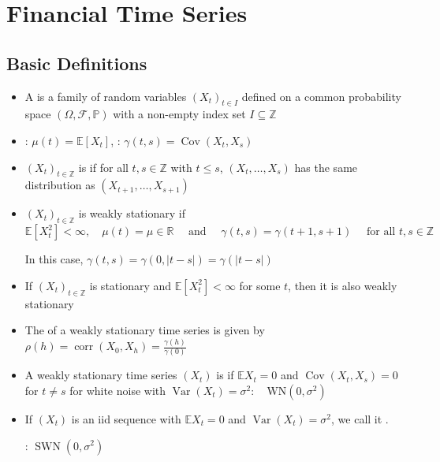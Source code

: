 \section{Financial Time Series}
\subsection*{Basic Definitions}
\begin{itemize}[leftmargin=*]
    \item A  is a family of random variables $\left(X_{t}\right)_{t \in I}$ defined on a common probability space $(\Omega, \mathcal{F}, \mathbb{P})$ with a non-empty index set $I \subseteq \mathbb{Z}$
    \item {}: $\mu(t)=\mathbb{E}\left[X_{t}\right]$, : $\gamma(t, s)=\operatorname{Cov}\left(X_{t}, X_{s}\right)$
    \item $\left(X_{t}\right)_{t \in \mathbb{Z}}$ is  if for all $t, s \in \mathbb{Z}$ with $t \leq s$,
$\left(X_{t}, \ldots, X_{s}\right)$ has the same distribution as $\left(X_{t+1}, \ldots, X_{s+1}\right)$
    \item $\left(X_{t}\right)_{t \in \mathbb{Z}}$ is weakly stationary if
$
\mathbb{E}\left[X_{t}^{2}\right]<\infty, \quad \mu(t)=\mu \in \mathbb{R} \quad \text { and } \quad \gamma(t, s)=\gamma(t+1, s+1) \quad \text { for all } t, s \in \mathbb{Z}
$

In this case, $\gamma(t, s)=\gamma(0,|t-s|)=\gamma(|t-s|)$
    \item If $\left(X_{t}\right)_{t \in \mathbb{Z}}$ is stationary and $\mathbb{E}\left[X_{t}^{2}\right]<\infty$ for some $t$, then it is also weakly stationary
    \item The  of a weakly stationary time series is given by
$
\rho(h)=\operatorname{corr}\left(X_{0}, X_{h}\right)=\frac{\gamma(h)}{\gamma(0)}
$
    \item A weakly stationary time series $\left(X_{t}\right)$ is  if
$
\mathbb{E} X_{t}=0$ and $\operatorname{Cov}\left(X_{t}, X_{s}\right)=0$ for $t \neq s
$
 for white noise with $\operatorname{Var}\left(X_{t}\right)=\sigma^{2}: \quad \mathrm{WN}\left(0, \sigma^{2}\right)$
    \item If $\left(X_{t}\right)$ is an iid sequence with $\mathbb{E} X_{t}=0$ and $\operatorname{Var}\left(X_{t}\right)=\sigma^{2}$, we call it . 
    
    : $\operatorname{SWN}\left(0, \sigma^{2}\right)$

\end{itemize}





